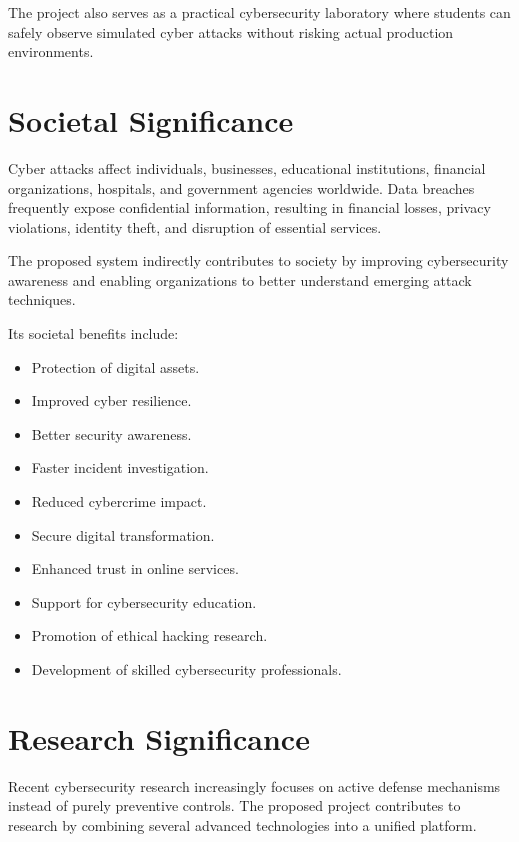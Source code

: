 \documentclass[12pt,a4paper]{report}
\begin{document}
The project also serves as a practical cybersecurity laboratory where students can safely observe simulated cyber attacks without risking actual production environments.


\section{Societal Significance}

Cyber attacks affect individuals, businesses, educational institutions, financial organizations, hospitals, and government agencies worldwide. Data breaches frequently expose confidential information, resulting in financial losses, privacy violations, identity theft, and disruption of essential services.

The proposed system indirectly contributes to society by improving cybersecurity awareness and enabling organizations to better understand emerging attack techniques.

Its societal benefits include:

\begin{itemize}
\item Protection of digital assets.
\item Improved cyber resilience.
\item Better security awareness.
\item Faster incident investigation.
\item Reduced cybercrime impact.
\item Secure digital transformation.
\item Enhanced trust in online services.
\item Support for cybersecurity education.
\item Promotion of ethical hacking research.
\item Development of skilled cybersecurity professionals.
\end{itemize}


\section{Research Significance}

Recent cybersecurity research increasingly focuses on active defense mechanisms instead of purely preventive controls. The proposed project contributes to research by combining several advanced technologies into a unified platform.
\end{document}
